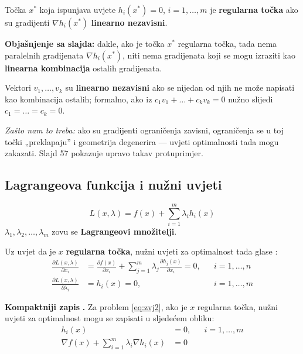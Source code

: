\begin{definicija}
Točka $x^{*}$ koja ispunjava uvjete $h_i(x^{*}) = 0$, $i = 1,\dots,m$ je
\textbf{regularna točka} ako su gradijenti $\nabla h_i(x^{*})$ \textbf{linearno
nezavisni}.
\end{definicija}

\textbf{Objašnjenje sa slajda:} dakle, ako je točka $x^{*}$ regularna točka,
tada nema paralelnih gradijenata $\nabla h_i(x^{*})$, niti nema gradijenata koji
se mogu izraziti kao \textbf{linearna kombinacija} ostalih gradijenata.

\begin{napomena}
Vektori $v_1,\dots,v_k$ su \textbf{linearno nezavisni} ako se nijedan od njih ne
može napisati kao kombinacija ostalih; formalno, ako iz
$c_1v_1 + \dots + c_kv_k = 0$ nužno slijedi $c_1 = \dots = c_k = 0$.

\emph{Zašto nam to treba:} ako su gradijenti ograničenja zavisni, ograničenja se
u toj točki „preklapaju” i geometrija degenerira --- uvjeti optimalnosti tada
mogu zakazati. Slajd 57 pokazuje upravo takav protuprimjer.
\end{napomena}

\subsection{Lagrangeova funkcija i nužni uvjeti}

\begin{definicija}
\[
L(x, \lambda) = f(x) + \sum_{i=1}^{m}\lambda_i h_i(x)
\]
$\lambda_1, \lambda_2, \dots, \lambda_m$ zovu se \textbf{Lagrangeovi
množitelji}.
\end{definicija}

Uz uvjet da je $x$ \textbf{regularna točka}, nužni uvjeti za optimalnost tada
glase :
\begin{align}
\frac{\partial L(x,\lambda)}{\partial x_i}
  &= \frac{\partial f(x)}{\partial x_i}
   + \sum_{j=1}^{m}\lambda_j\frac{\partial h_j(x)}{\partial x_i} = 0,
  && i = 1,\dots,n \\
\frac{\partial L(x,\lambda)}{\partial \lambda_i}
  &= h_i(x) = 0, && i = 1,\dots,m
\end{align}

\textbf{Kompaktniji zapis} \textbf{.} Za problem \eqref{eq:zvj2}, ako je
$x$ regularna točka, nužni uvjeti za optimalnost mogu se zapisati u sljedećem
obliku:
\begin{align}
h_i(x) &= 0, && i = 1,\dots,m \\
\nabla f(x) + \sum_{i=1}^{m}\lambda_i\nabla h_i(x) &= 0
\end{align}

